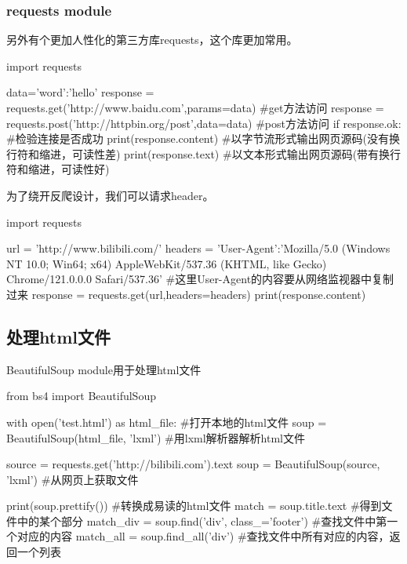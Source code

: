     \subsubsection{requests module}
      另外有个更加人性化的第三方库requests，这个库更加常用。
      \begin{codeblock}[language=python, caption={requests module}]
        import requests

        data={'word':'hello'}
        response = requests.get('http://www.baidu.com',params=data) #get方法访问
        response = requests.post('http://httpbin.org/post',data=data) #post方法访问
        if response.ok: #检验连接是否成功
            print(response.content) #以字节流形式输出网页源码(没有换行符和缩进，可读性差)
            print(response.text) #以文本形式输出网页源码(带有换行符和缩进，可读性好)
      \end{codeblock}

      为了绕开反爬设计，我们可以请求header。
      \begin{codeblock}[language=python, caption={Handling request headers}]
        import requests

        url = 'http://www.bilibili.com/'
        headers = {'User-Agent':'Mozilla/5.0 (Windows NT 10.0; Win64; x64) AppleWebKit/537.36 
            (KHTML, like Gecko) Chrome/121.0.0.0 Safari/537.36'}
        #这里User-Agent的内容要从网络监视器中复制过来
        response = requests.get(url,headers=headers)
        print(response.content)
      \end{codeblock}

  \subsection{处理html文件}
    BeautifulSoup module用于处理html文件
    \begin{codeblock}[language=python, caption={Handling HTML}]
      from bs4 import BeautifulSoup

      with open('test.html') as html_file: #打开本地的html文件
          soup = BeautifulSoup(html_file, 'lxml') #用lxml解析器解析html文件

      source = requests.get('http://bilibili.com').text
      soup = BeautifulSoup(source, 'lxml') #从网页上获取文件

      print(soup.prettify()) #转换成易读的html文件
      match = soup.title.text #得到文件中的某个部分
      match_div = soup.find('div', class_='footer') #查找文件中第一个对应的内容
      match_all = soup.find_all('div') #查找文件中所有对应的内容，返回一个列表
    \end{codeblock}

